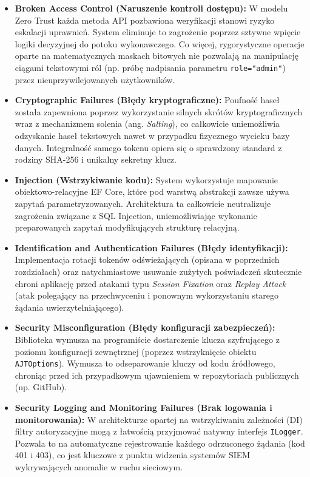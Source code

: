 \documentclass{SGGW-thesis}
\begin{document}
\begin{itemize}
    \item \textbf{Broken Access Control (Naruszenie kontroli dostępu):} W modelu Zero Trust każda metoda API pozbawiona weryfikacji stanowi ryzyko eskalacji uprawnień. System eliminuje to zagrożenie poprzez sztywne wpięcie logiki decyzyjnej do potoku wykonawczego. Co więcej, rygorystyczne operacje oparte na matematycznych maskach bitowych nie pozwalają na manipulację ciągami tekstowymi ról (np. próbę nadpisania parametru \texttt{role="admin"}) przez nieuprzywilejowanych użytkowników.
    
    \item \textbf{Cryptographic Failures (Błędy kryptograficzne):} Poufność haseł została zapewniona poprzez wykorzystanie silnych skrótów kryptograficznych wraz z mechanizmem solenia (ang. \textit{Salting}), co całkowicie uniemożliwia odzyskanie haseł tekstowych nawet w przypadku fizycznego wycieku bazy danych. Integralność samego tokenu opiera się o sprawdzony standard z rodziny SHA-256 i unikalny sekretny klucz.
    
    \item \textbf{Injection (Wstrzykiwanie kodu):} System wykorzystuje mapowanie obiektowo-relacyjne EF Core, które pod warstwą abstrakcji zawsze używa zapytań parametryzowanych. Architektura ta całkowicie neutralizuje zagrożenia związane z SQL Injection, uniemożliwiając wykonanie preparowanych zapytań modyfikujących strukturę relacyjną.
    
    \item \textbf{Identification and Authentication Failures (Błędy identyfikacji):} Implementacja rotacji tokenów odświeżających (opisana w poprzednich rozdziałach) oraz natychmiastowe usuwanie zużytych poświadczeń skutecznie chroni aplikację przed atakami typu \textit{Session Fixation} oraz \textit{Replay Attack} (atak polegający na przechwyceniu i ponownym wykorzystaniu starego żądania uwierzytelniającego).
    
    \item \textbf{Security Misconfiguration (Błędy konfiguracji zabezpieczeń):} Biblioteka wymusza na programiście dostarczenie klucza szyfrującego z poziomu konfiguracji zewnętrznej (poprzez wstrzyknięcie obiektu \texttt{AJTOptions}). Wymusza to odseparowanie kluczy od kodu źródłowego, chroniąc przed ich przypadkowym ujawnieniem w repozytoriach publicznych (np. GitHub).

    \item \textbf{Security Logging and Monitoring Failures (Brak logowania i monitorowania):} W architekturze opartej na wstrzykiwaniu zależności (DI) filtry autoryzacyjne mogą z łatwością przyjmować natywny interfejs \texttt{ILogger}. Pozwala to na automatyczne rejestrowanie każdego odrzuconego żądania (kod 401 i 403), co jest kluczowe z punktu widzenia systemów SIEM wykrywających anomalie w ruchu sieciowym.
\end{itemize}
\end{document}
